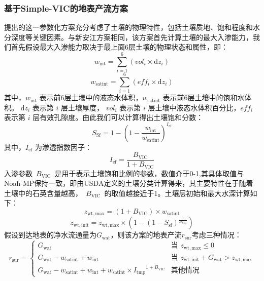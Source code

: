 \subsubsection{基于Simple-VIC的地表产流方案}
\cite{Liang2003Anew}提出的这一参数化方案充分考虑了土壤的物理特性，包括土壤质地、饱和程度和水分深度等关键因素。与新安江方案相同，该方案首先计算土壤的最大入渗能力，我们首先假设最大入渗能力取决于最上面6层土壤的物理状态和属性，即：
\begin{equation}
w_{\mathrm{{int}}} = \sum_{i=1}^{6}\left( {vol}_{i} \times {{\mathrm {d}} z}_{i} \right)
\end{equation}
\begin{equation}
w_{\mathrm{{satint}}} = \sum_{i=1}^{6}\left( {eff}_{i} \times {{\mathrm {d}} z}_{i} \right)
\end{equation}
其中，$w_{\mathrm{{int}}}$ 表示前6层土壤中的液态水体积，$w_{\mathrm{{satint}}}$ 表示前6层土壤中的饱和水体积。 ${{\mathrm {d}} z}_{i}$ 表示第 $i$ 层土壤厚度， ${vol}_{i}$ 表示第 $i$ 层土壤中液态水体积百分比，${eff}_{i}$ 表示第 $i$ 层有效孔隙度。由此我们可以计算得出土壤饱和分数：
\begin{equation}
{S}_{\mathrm{{Sf}}} = 1 - \left( 1 - \frac{w_{\mathrm{{int}}}}{w_{\mathrm{{satint}}}} \right)^{{I}_{\mathrm{{ef}}}}
\end{equation}
其中，${I}_{\mathrm{{ef}}}$ 为渗透指数因子：
\begin{equation}
{I}_{\mathrm{{ef}}} = \frac{B_{\mathrm{{VIC}}}}{1 + B_{\text{VIC}}}
\end{equation}
入渗参数~$B_{\mathrm{{VIC}}}$~是用于表示土壤饱和比例的参数，数值介于0-1,其具体取值与Noah-MP保持一致，即由USDA定义的土壤分类计算得来，其主要特性在于随着土壤中的石英含量越高，~$B_{\mathrm{VIC}}$~的取值越接近于1。土壤层初始和最大水深计算如下：
\begin{equation}
z_{\mathrm{wt,max}}= \left( 1 + B_{\mathrm{{VIC}}} \right) \times w_{\mathrm{{satint}}}
\end{equation}
\begin{equation}
z_{\mathrm{wt,init}} = z_{\mathrm{wt,max}} \times \left( 1 - \left( 1 - {S}_{\mathrm{{sf}}} \right)^{\frac{1}{B_{\mathrm{{VIC}}}}} \right)
\end{equation}
假设到达地表的净水流通量为$G_{\mathrm{wat}}$，则该方案的地表产流$r_{\mathrm{sur}}$考虑三种情况：
\begin{equation}
r_{\mathrm{sur}} = 
\begin{cases}
G_{\mathrm{wat}} & \text{当 } z_{\mathrm{wt,max}} \leq 0 \\
G_{\mathrm{wat}} - w_{\mathrm{{satint}}} + w_{\mathrm{{int}}} & \text{当 } z_{\mathrm{wt,init}} + G_{\mathrm{wat}} > z_{\mathrm{wt,max}} \\
G_{\mathrm{wat}}- w_{\mathrm{{satint}}} + w_{\mathrm{{int}}} + w_{\mathrm{{satint}}} \times {{I}_{\mathrm{{tmp}}}}^{1 + B_{\mathrm{{VIC}}}} & \text{其他情况}
\end{cases}
\end{equation}
